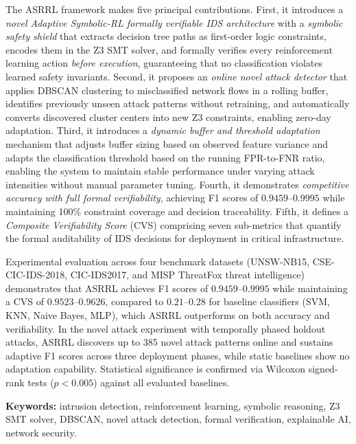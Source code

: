 \documentclass[12pt, letterpaper, oneside]{report}
\newcommand{\ASRRL}{\textsc{ASRRL}}
\begin{document}
The \ASRRL{} framework makes five principal contributions. First, it introduces a \emph{novel Adaptive Symbolic-RL formally verifiable IDS architecture} with a \emph{symbolic safety shield} that extracts decision tree paths as first-order logic constraints, encodes them in the Z3 SMT solver, and formally verifies every reinforcement learning action \emph{before execution}, guaranteeing that no classification violates learned safety invariants. Second, it proposes an \emph{online novel attack detector} that applies DBSCAN clustering to misclassified network flows in a rolling buffer, identifies previously unseen attack patterns without retraining, and automatically converts discovered cluster centers into new Z3 constraints, enabling zero-day adaptation. Third, it introduces a \emph{dynamic buffer and threshold adaptation} mechanism that adjusts buffer sizing based on observed feature variance and adapts the classification threshold based on the running FPR-to-FNR ratio, enabling the system to maintain stable performance under varying attack intensities without manual parameter tuning. Fourth, it demonstrates \emph{competitive accuracy with full formal verifiability}, achieving F1 scores of $0.9459$--$0.9995$ while maintaining 100\% constraint coverage and decision traceability. Fifth, it defines a \emph{Composite Verifiability Score} (CVS) comprising seven sub-metrics that quantify the formal auditability of IDS decisions for deployment in critical infrastructure.

Experimental evaluation across four benchmark datasets (UNSW-NB15, CSE-CIC-IDS-2018, CIC-IDS2017, and MISP ThreatFox threat intelligence) demonstrates that \ASRRL{} achieves F1 scores of $0.9459$--$0.9995$ while maintaining a CVS of $0.9523$--$0.9626$, compared to $0.21$--$0.28$ for baseline classifiers (SVM, KNN, Naive Bayes, MLP), which \ASRRL{} outperforms on both accuracy and verifiability. In the novel attack experiment with temporally phased holdout attacks, \ASRRL{} discovers up to 385 novel attack patterns online and sustains adaptive F1 scores across three deployment phases, while static baselines show no adaptation capability. Statistical significance is confirmed via Wilcoxon signed-rank tests ($p < 0.005$) against all evaluated baselines.

\textbf{Keywords:} intrusion detection, reinforcement learning, symbolic reasoning, Z3 SMT solver, DBSCAN, novel attack detection, formal verification, explainable AI, network security.

\end{document}
